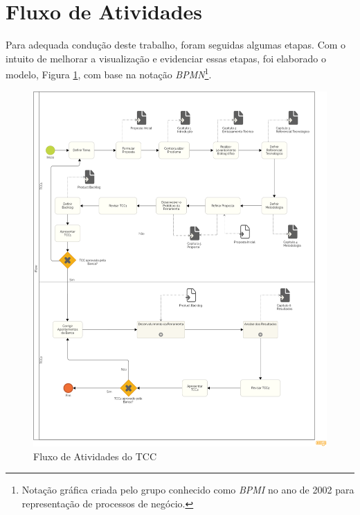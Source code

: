 \section{Fluxo de Atividades}

\label{sec:fluxo_atividade}
    
Para adequada condução deste trabalho, foram seguidas algumas etapas. Com o intuito de melhorar a visualização e evidenciar essas etapas, foi elaborado o modelo, Figura \ref{fig:bpmn_geral}, com base na notação \textit{BPMN}\footnote{Notação gráfica criada pelo grupo conhecido como \textit{BPMI} no ano de 2002 para representação de processos de negócio.}.

\begin{figure}[H]
    \begin{center}
        \caption{Fluxo de Atividades do TCC}
        \label{fig:bpmn_geral}
        \includegraphics[scale=0.3]{figuras/Metodologia/bpmn_geral.png}
    \end{center}
\end{figure}

